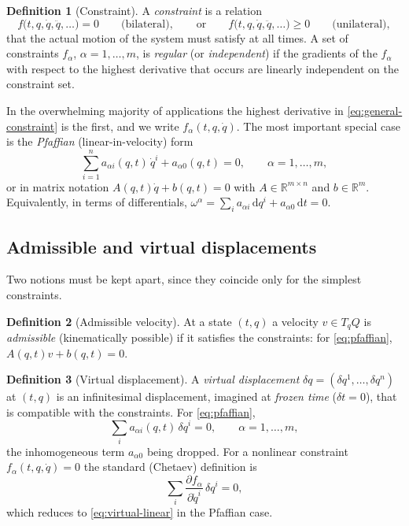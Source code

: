 \documentclass[11pt,a4paper]{article}
\theoremstyle{definition}
\newtheorem{definition}{Definition}[section]
\theoremstyle{plain}
\theoremstyle{remark}
\newcommand{\R}{\mathbb{R}}
\newcommand{\dd}{\mathrm{d}}
\newcommand{\pd}[2]{\frac{\partial #1}{\partial #2}}
\begin{document}
\begin{definition}[Constraint]\label{def:constraint}
A \emph{constraint} is a relation
\begin{equation}\label{eq:general-constraint}
  f\bigl(t,q,\dot q,\ddot q,\dots\bigr)=0
  \qquad\text{(bilateral)},\qquad\text{or}\qquad
  f\bigl(t,q,\dot q,\ddot q,\dots\bigr)\ge 0
  \qquad\text{(unilateral)},
\end{equation}
that the actual motion of the system must satisfy at all times. A set of constraints
$f_\alpha$, $\alpha=1,\dots,m$, is \emph{regular} (or \emph{independent}) if the
gradients of the $f_\alpha$ with respect to the highest derivative that occurs are
linearly independent on the constraint set.
\end{definition}

In the overwhelming majority of applications the highest derivative in
\eqref{eq:general-constraint} is the first, and we write $f_\alpha(t,q,\dot q)$. The most
important special case is the \emph{Pfaffian} (linear-in-velocity) form
\begin{equation}\label{eq:pfaffian}
  \sum_{i=1}^n a_{\alpha i}(q,t)\,\dot q^i + a_{\alpha 0}(q,t)=0,\qquad \alpha=1,\dots,m,
\end{equation}
or in matrix notation $A(q,t)\dot q+b(q,t)=0$ with $A\in\R^{m\times n}$ and $b\in\R^m$.
Equivalently, in terms of differentials, $\omega^\alpha=\sum_i a_{\alpha i}\,\dd q^i
+a_{\alpha 0}\,\dd t=0$.

\subsection{Admissible and virtual displacements}\label{sec:virtual}
Two notions must be kept apart, since they coincide only for the simplest constraints.

\begin{definition}[Admissible velocity]
At a state $(t,q)$ a velocity $v\in T_qQ$ is \emph{admissible} (kinematically possible) if
it satisfies the constraints: for \eqref{eq:pfaffian}, $A(q,t)v+b(q,t)=0$.
\end{definition}

\begin{definition}[Virtual displacement]
A \emph{virtual displacement} $\delta q=(\delta q^1,\dots,\delta q^n)$ at $(t,q)$ is an
infinitesimal displacement, imagined at \emph{frozen time} ($\delta t=0$), that is compatible with the
constraints. For \eqref{eq:pfaffian},
\begin{equation}\label{eq:virtual-linear}
  \sum_{i}a_{\alpha i}(q,t)\,\delta q^i=0,\qquad \alpha=1,\dots,m,
\end{equation}
the inhomogeneous term $a_{\alpha0}$ being dropped. For a nonlinear constraint
$f_\alpha(t,q,\dot q)=0$ the standard (Chetaev) definition is
\begin{equation}\label{eq:chetaev}
  \sum_{i}\pd{f_\alpha}{\dot q^i}\,\delta q^i=0,
\end{equation}
which reduces to \eqref{eq:virtual-linear} in the Pfaffian case.
\end{definition}
\end{document}

